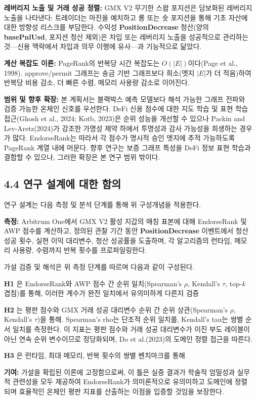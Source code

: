 \textbf{레버리지 노출 및 거래 성공 정렬: }GMX V2 무기한 스왑 포지션은 담보화된 레버리지 노출을 나타낸다: 트레이더는 마진을 예치하고 롱 또는 숏 포지션을 통해 기초 자산에 대한 방향성 리스크를 부담한다. 수익성 \textbf{PositionDecrease} 청산(양의 \textbf{basePnlUsd}, 포지션 청산 제외)은 차입 또는 레버리지 노출을 성공적으로 관리하는 것---신용 맥락에서 차입과 의무 이행에 유사---과 기능적으로 닮았다.


\textbf{계산 복잡도 이론: }PageRank의 반복당 시간 복잡도는 $O(|E|)$이다(Page et al., 1998). approve/permit 그래프는 송금 기반 그래프보다 희소(엣지 $|E|$가 더 적음)하여 반복당 비용 감소, 더 빠른 수렴, 메모리 사용량 감소로 이어진다.


\textbf{범위 및 향후 확장: }본 계획서는 블랙박스 예측 모델보다 해석 가능한 그래프 전파와 검증 가능한 온체인 신호를 우선한다. DeFi 신용 점수에 대한 지도 학습 및 표현 학습 접근(Ghosh et al., 2024; Kotb, 2023)은 순위 성능을 개선할 수 있으나 Packin and Lev-Aretz(2024)가 강조한 가명성 제약 하에서 투명성과 감사 가능성을 희생하는 경우가 많다. EndorseRank는 따라서 각 점수가 명시적 승인 엣지에 추적 가능하도록 PageRank 계열 내에 머문다. 향후 연구는 보증 그래프 특성을 DeFi 정보 표현 학습과 결합할 수 있으나, 그러한 확장은 본 연구 범위 밖이다.


\subsection*{4.4 연구 설계에 대한 함의}
\label{sec:implications-for-research-design}

연구 설계는 다음 측정 및 분석 단계를 통해 위 구성개념을 적용한다.

\textbf{측정: }Arbitrum One에서 GMX V2 활성 지갑의 매칭 표본에 대해 EndorseRank 및 AWP 점수를 계산하고, 정의된 관찰 기간 동안 \textbf{PositionDecrease} 이벤트에서 청산 성공 횟수, 실현 이익 대리변수, 청산 성공률을 도출하며, 각 알고리즘의 런타임, 메모리 사용량, 수렴까지 반복 횟수를 프로파일링한다.


가설 검증 및 해석은 위 측정 단계를 따르며 다음과 같이 구성된다.



\textbf{H1 }은 EndorseRank와 AWP 점수 간 순위 일치(Spearman's \emph{\(\rho\)}, Kendall's \emph{\(\tau\)}, top-\emph{k} 겹침)를 통해, 이러한 계수가 완전 일치에서 유의미하게 다른지 검증


\textbf{H2 }는 평판 점수와 GMX 거래 성공 대리변수 순위 간 순위 상관(Spearman's \emph{\(\rho\)}, Kendall's \emph{\(\tau\)})을 통해. Spearman's rho는 단조적 순위 일치를, Kendall's tau는 쌍별 순서 일치를 측정한다. 이 지표는 평판 점수와 거래 성공 대리변수가 이진 부도 레이블이 아닌 연속 순위 변수이므로 정당화되며, Do et al.(2023)의 도메인 정렬 접근을 따른다.


\textbf{H3 }은 런타임, 최대 메모리, 반복 횟수의 쌍별 벤치마크를 통해


\textbf{기여: }가설을 확립된 이론에 고정함으로써, 이 틀은 실증 결과가 학술적 엄밀성과 실무적 관련성을 모두 제공하여 EndorseRank가 의미론적으로 유의미하고 도메인에 정렬되며 효율적인 온체인 평판 지표를 산출하는 이점을 입증할 것임을 보장한다.
